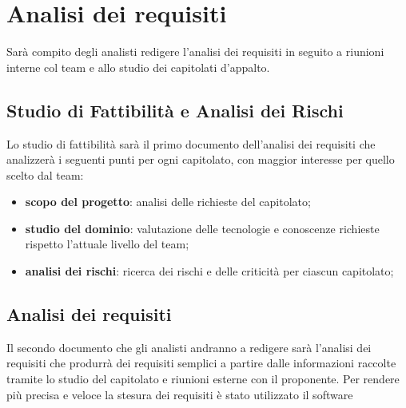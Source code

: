 \section{Analisi dei requisiti}
Sarà compito degli analisti redigere l'analisi dei requisiti in seguito a riunioni interne col team e allo studio dei capitolati d'appalto.
	\subsection{Studio di Fattibilità e Analisi dei Rischi}
	Lo studio di fattibilità sarà il primo documento dell'analisi dei requisiti che analizzerà i seguenti punti per ogni capitolato, con maggior interesse per quello scelto dal team:
	\begin{itemize}
		\item \textbf{scopo del progetto}: analisi delle richieste del capitolato;
		\item \textbf{studio del dominio}: valutazione delle tecnologie e conoscenze richieste rispetto l'attuale livello del team;
		\item \textbf{analisi dei rischi}: ricerca dei rischi e delle criticità per ciascun capitolato;
	\end{itemize}
	\subsection{Analisi dei requisiti}
	Il secondo documento che gli analisti andranno a redigere sarà l'analisi dei requisiti che produrrà dei requisiti semplici a partire dalle informazioni raccolte tramite lo studio del capitolato e riunioni esterne con il proponente.
	Per rendere più precisa e veloce la stesura dei requisiti è stato utilizzato il software 

